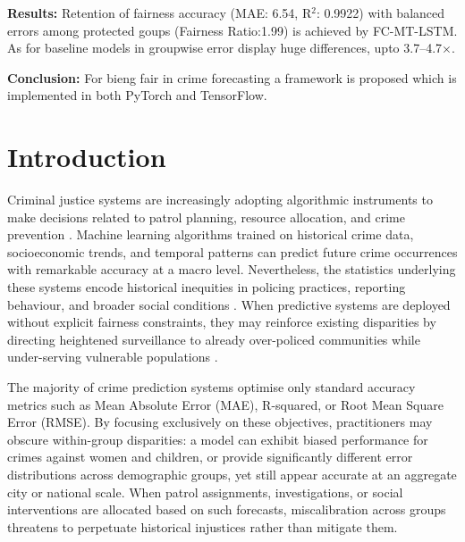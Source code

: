 \documentclass{svproc}
\newcommand{\modelname}{FC-MT-LSTM}
\begin{document}
\noindent\textbf{Results:} Retention of fairness accuracy (MAE: 6.54, R$^2$: 0.9922) with balanced errors among protected goups (Fairness Ratio:1.99) is achieved by \modelname{}. As for baseline models in groupwise error display huge differences, upto 3.7--4.7$\times$.

\noindent\textbf{Conclusion:} For bieng fair in crime forecasting a framework is proposed which is implemented in both PyTorch and TensorFlow.


\section{Introduction}

Criminal justice systems are increasingly adopting algorithmic instruments to make decisions related to patrol planning, resource allocation, and crime prevention \cite{perry2013predictive}. Machine learning algorithms trained on historical crime data, socioeconomic trends, and temporal patterns can predict future crime occurrences with remarkable accuracy at a macro level. Nevertheless, the statistics underlying these systems encode historical inequities in policing practices, reporting behaviour, and broader social conditions \cite{barocas2016big,lum2016predict}. When predictive systems are deployed without explicit fairness constraints, they may reinforce existing disparities by directing heightened surveillance to already over-policed communities while under-serving vulnerable populations \cite{richardson2019dirty,wu2024improving}.

The majority of crime prediction systems optimise only standard accuracy metrics such as Mean Absolute Error (MAE), R-squared, or Root Mean Square Error (RMSE). By focusing exclusively on these objectives, practitioners may obscure within-group disparities: a model can exhibit biased performance for crimes against women and children, or provide significantly different error distributions across demographic groups, yet still appear accurate at an aggregate city or national scale. When patrol assignments, investigations, or social interventions are allocated based on such forecasts, miscalibration across groups threatens to perpetuate historical injustices rather than mitigate them.
\end{document}
